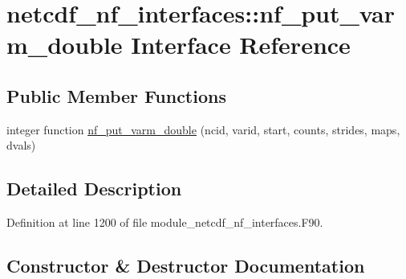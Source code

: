 \hypertarget{interfacenetcdf__nf__interfaces_1_1nf__put__varm__double}{}\section{netcdf\+\_\+nf\+\_\+interfaces\+:\+:nf\+\_\+put\+\_\+varm\+\_\+double Interface Reference}
\label{interfacenetcdf__nf__interfaces_1_1nf__put__varm__double}
\subsection*{Public Member Functions}
\begin{DoxyCompactItemize}
\item 
integer function \hyperlink{interfacenetcdf__nf__interfaces_1_1nf__put__varm__double_a634717ec23f0b2059e5732dc7b149c85}{nf\+\_\+put\+\_\+varm\+\_\+double} (ncid, varid, start, counts, strides, maps, dvals)
\end{DoxyCompactItemize}


\subsection{Detailed Description}


Definition at line 1200 of file module\+\_\+netcdf\+\_\+nf\+\_\+interfaces.\+F90.



\subsection{Constructor \& Destructor Documentation}
\mbox{\label{interfacenetcdf__nf__interfaces_1_1nf__put__varm__double_a634717ec23f0b2059e5732dc7b149c85}} 

